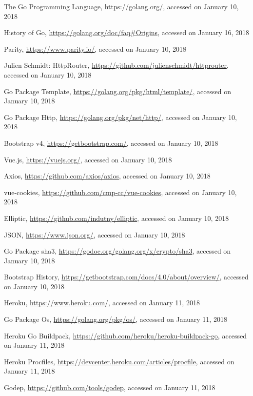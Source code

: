 \begin{thebibliography}{99}
 The Go Programming Language, \url{https://golang.org/}, accessed on January 10, 2018

 History of Go, \url{https://golang.org/doc/faq#Origins}, accessed on January 16, 2018

 Parity, \url{https://www.parity.io/}, accessed on January 10, 2018

 Julien Schmidt: HttpRouter, \url{https://github.com/julienschmidt/httprouter}, accessed on January 10, 2018

 Go Package Template, \url{https://golang.org/pkg/html/template/}, accessed on January 10, 2018

 Go Package Http, \url{https://golang.org/pkg/net/http/}, accessed on January 10, 2018

 Bootstrap v4, \url{https://getbootstrap.com/}, accessed on January 10, 2018

 Vue.js, \url{https://vuejs.org/}, accessed on January 10, 2018

 Axios, \url{https://github.com/axios/axios}, accessed on January 10, 2018

 vue-cookies, \url{https://github.com/cmp-cc/vue-cookies}, accessed on January 10, 2018

 Elliptic, \url{https://github.com/indutny/elliptic}, accessed on January 10, 2018

 JSON, \url{https://www.json.org/}, accessed on January 10, 2018

 Go Package sha3, \url{https://godoc.org/golang.org/x/crypto/sha3}, accessed on January 10, 2018

 Bootstrap History, \url{https://getbootstrap.com/docs/4.0/about/overview/}, accessed on January 10, 2018

 Heroku, \url{https://www.heroku.com/}, accessed on January 11, 2018

 Go Package Os, \url{https://golang.org/pkg/os/}, accessed on January 11, 2018

 Heroku Go Buildpack, \url{https://github.com/heroku/heroku-buildpack-go}, accessed on January 11, 2018

 Heroku Procfiles, \url{https://devcenter.heroku.com/articles/procfile}, accessed on January 11, 2018

 Godep, \url{https://github.com/tools/godep}, accessed on January 11, 2018


\end{thebibliography}
